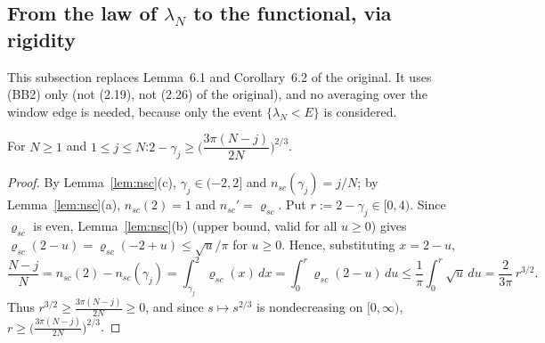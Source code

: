 \subsection{From the law of $\lambda_N$ to the functional, via rigidity}\label{sec:sandwich}
This subsection replaces Lemma~6.1 and Corollary~6.2 of the original. It uses (BB2) only (not (2.19), not (2.26) of the original), and no
averaging over the window edge is needed, because only the event $\{\lambda_N<E\}$ is considered.

\begin{lemma}\label{lem:gamma}
For $N\ge1$ and $1\le j\le N$:\quad $2-\gamma_j\ge\Big(\dfrac{3\pi(N-j)}{2N}\Big)^{2/3}$.
\end{lemma}
\begin{proof}
By Lemma~\ref{lem:nsc}(c), $\gamma_j\in(-2,2]$ and $n_{sc}(\gamma_j)=j/N$; by Lemma~\ref{lem:nsc}(a), $n_{sc}(2)=1$ and $n_{sc}'=\varrho_{sc}$. Put $r:=2-\gamma_j\in[0,4)$. Since
$\varrho_{sc}$ is even, Lemma~\ref{lem:nsc}(b) (upper bound, valid for all $u\ge0$) gives $\varrho_{sc}(2-u)=\varrho_{sc}(-2+u)\le\sqrt u/\pi$ for $u\ge0$. Hence,
substituting $x=2-u$,
\[
\frac{N-j}N=n_{sc}(2)-n_{sc}(\gamma_j)=\int_{\gamma_j}^2\varrho_{sc}(x)\,dx=\int_0^{r}\varrho_{sc}(2-u)\,du\le\frac1\pi\int_0^r\sqrt u\,du=\frac2{3\pi}\,r^{3/2}.
\]
Thus $r^{3/2}\ge\frac{3\pi(N-j)}{2N}\ge0$, and since $s\mapsto s^{2/3}$ is nondecreasing on $[0,\infty)$, $r\ge\big(\frac{3\pi(N-j)}{2N}\big)^{2/3}$.
\end{proof}


